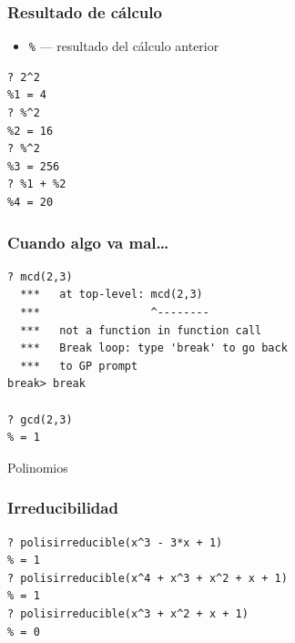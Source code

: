 \documentclass{beamer}
\begin{document}

\begin{frame}[fragile]
  \frametitle{Resultado de cálculo}

  \begin{itemize}
  \item \texttt{\%} --- resultado del cálculo anterior
  \end{itemize}

  \begin{shaded}
\begin{verbatim}
? 2^2
%1 = 4
? %^2
%2 = 16
? %^2
%3 = 256
? %1 + %2
%4 = 20
\end{verbatim}
  \end{shaded}
\end{frame}


\begin{frame}[fragile]
  \frametitle{Cuando algo va mal\dots}

  \begin{shaded}
\begin{verbatim}
? mcd(2,3)
  ***   at top-level: mcd(2,3)
  ***                 ^--------
  ***   not a function in function call
  ***   Break loop: type 'break' to go back
  ***   to GP prompt
break> break

? gcd(2,3)
% = 1
\end{verbatim}
  \end{shaded}
\end{frame}


\begin{frame}[plain]
  \headingfont

  \begin{center}
    {\huge Polinomios}
  \end{center}
\end{frame}


\begin{frame}[fragile]
  \frametitle{Irreducibilidad}

  \begin{shaded}
\begin{verbatim}
? polisirreducible(x^3 - 3*x + 1)
% = 1
? polisirreducible(x^4 + x^3 + x^2 + x + 1)
% = 1
? polisirreducible(x^3 + x^2 + x + 1)
% = 0
\end{verbatim}
  \end{shaded}
\end{frame}
\end{document}
